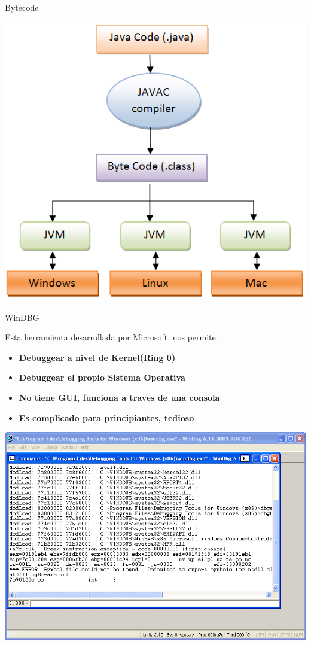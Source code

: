 \documentclass{beamer}
\begin{document}
\begin{frame}{Bytecode}

\begin{center}
\includegraphics[scale=0.3]{java-program-execution2.png}
\end{center}

\end{frame}

\begin{frame}{WinDBG}

Esta herramienta desarrollada por Microsoft, nos permite:
\begin{itemize}
\item \textbf{Debuggear a nivel de Kernel(Ring 0)}
\item \textbf{Debuggear el propio Sistema Operativa}
\item \textbf{No tiene GUI, funciona a traves de una consola}
\item \textbf{Es complicado para principiantes, tedioso}
\end{itemize}
\begin{center}
\includegraphics[scale=0.21]{windbg.png}
\end{center}

\end{frame}
\end{document}
